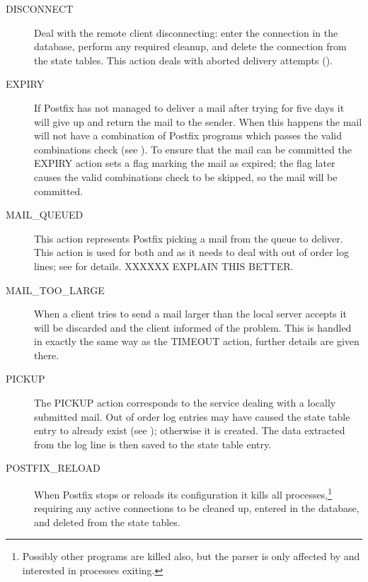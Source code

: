 \begin{description}
    \item [DISCONNECT] Deal with the remote client disconnecting: enter the
        connection in the database, perform any required cleanup, and
        delete the connection from the state tables.  This action deals
        with aborted delivery attempts
        ().

    \item [EXPIRY] If Postfix has not managed to deliver a mail after
        trying for five days it will give up and return the mail to the
        sender.  When this happens the mail will not have a combination of
        Postfix programs which passes the valid combinations check (see
        ).  To ensure that the mail can
        be committed the EXPIRY action sets a flag marking the mail as
        expired; the flag later causes the valid combinations check to be
        skipped, so the mail will be committed.

    \item [MAIL\_QUEUED] This action represents Postfix picking a mail from
        the queue to deliver. This action is used for both 
        and  as it needs to deal with out of order log
        lines; see  for details.
        XXXXXX EXPLAIN THIS BETTER\@.

    \item [MAIL\_TOO\_LARGE] When a client tries to send a mail larger than
        the local server accepts it will be discarded and the client
        informed of the problem.  This is handled in exactly the same way
        as the TIMEOUT action, further details are given there.

    \item [PICKUP] The PICKUP action corresponds to the 
        service dealing with a locally submitted mail.  Out of order log
        entries may have caused the state table entry to already exist (see
        ); otherwise it is
        created.  The data extracted from the log line is then saved to the
        state table entry.

    \item [POSTFIX\_RELOAD] When Postfix stops or reloads its configuration
        it kills all  processes,\footnote{Possibly other
        programs are killed also, but the parser is only affected by and
        interested in  processes exiting.} requiring any
        active connections to be cleaned up, entered in the database, and
        deleted from the state tables.


\end{description}
